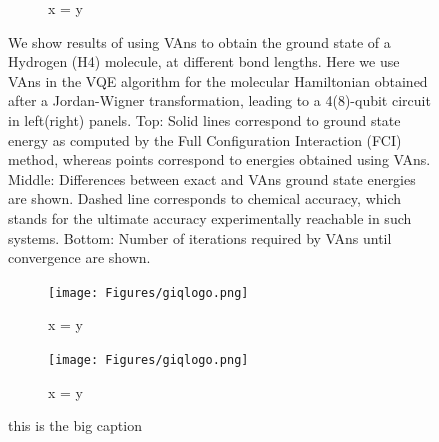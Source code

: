\begin{figure}
\begin{subfigure}[b]{.49\textwidth}
      \caption{x = y}
  \end{subfigure}
\caption{We show results of using VAns to obtain the ground state of a Hydrogen (H4) molecule, at different bond lengths. Here we use VAns in the VQE algorithm for the molecular Hamiltonian obtained after a Jordan-Wigner transformation, leading to a 4(8)-qubit circuit in left(right) panels. Top: Solid lines correspond to ground state energy as computed by the Full Configuration Interaction (FCI) method, whereas points correspond to energies obtained using VAns. Middle: Differences between exact and VAns ground state energies are shown. Dashed line corresponds to chemical accuracy, which stands for the ultimate accuracy experimentally reachable in such systems. Bottom: Number of iterations required by VAns until convergence are shown.}
\end{figure}


\begin{figure}
\centering
  \begin{subfigure}[b]{0.3\textwidth}
      \centering
      \texttt{[image: Figures/giqlogo.png]}
      \caption{x = y}
  \end{subfigure}
  \hfill
  \begin{subfigure}[b]{0.3\textwidth}
      \centering
      \texttt{[image: Figures/giqlogo.png]}
      \caption{x = y}
  \end{subfigure}
\caption{this is the big caption}
\end{figure}
